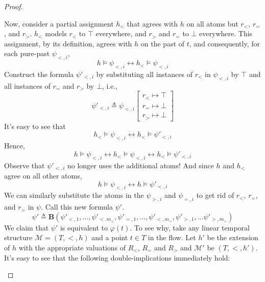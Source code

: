\documentclass[a4paper,UKenglish,cleveref, autoref, thm-restate, numberwithinsect]{lipics-v2021}
\begin{document}
\begin{proof}
\begin{description}
        Now, consider a partial assignment $h_<$ that agrees with $h$ on all atoms but $r_<$, $r_=$, and $r_>$. $h_<$ models $r_<$ to $\top$ everywhere, and $r_>$ and $r_=$ to $\bot$ everywhere. This assignment, by its definition, agrees with $h$ on the past of $t$, and consequently, for each pure-past $\psi_{<, i}$,
        \begin{equation*}
            h \vDash \psi_{<, i} \longleftrightarrow h_< \vDash \psi_{<, i}
        \end{equation*}
        Construct the formula $\psi'_{<, i}$ by substituting all instances of $r_<$ in $\psi_{<, i}$ by $\top$ and all instances of $r_=$ and $r_>$ by $\bot$, i.e.,
        \begin{equation*}
            \psi'_{<, i} \triangleq \psi_{<, i} \left[ \begin{smallmatrix}
                r_< \mapsto \top\\
                r_= \mapsto \bot\\
                r_> \mapsto \bot
            \end{smallmatrix} \right]
        \end{equation*}
        It's easy to see that
        \begin{equation*}
            h_< \vDash \psi_{<, i} \longleftrightarrow h_< \vDash \psi'_{<, i}
        \end{equation*}
        Hence,
        \begin{equation*}
            h \vDash \psi_{<, i} \longleftrightarrow h_< \vDash \psi_{<, i} \longleftrightarrow h_< \vDash \psi'_{<, i}
        \end{equation*}
        Observe that $\psi'_{<, i}$ no longer uses the additional atoms! And since $h$ and $h_<$ agree on all other atoms,
        \begin{equation*}
            h \vDash \psi_{<, i} \longleftrightarrow h \vDash \psi'_{<, i}
        \end{equation*}
        We can similarly substitute the atoms in the $\psi_{>, i}$ and $\psi_{=, i}$ to get rid of $r_<$, $r_=$, and $r_>$ in $\psi$. Call this new formula $\psi'$.
        \begin{equation*}
            \psi' \triangleq \mathbf{B}(\psi'_{<, 1}, \ldots, \psi'_{<. m_<}, \psi'_{=, 1}, \ldots, \psi'_{<, m_=}, \psi'_{>, 1}, \ldots \psi'_{>, m_>})
        \end{equation*}
        We claim that $\psi'$ is equivalent to $\varphi(t)$. To see why, take any linear temporal structure $\mathcal{M} = (T, <, h)$ and a point $t \in T$ in the flow. Let $h'$ be the extension of $h$ with the appropriate valuations of $R_<$, $R_=$ and $R_>$ and $\mathcal{M}'$ be $(T, <, h')$. It's easy to see that the following double-implications immediately hold:

\end{description}
\end{proof}
\end{document}

